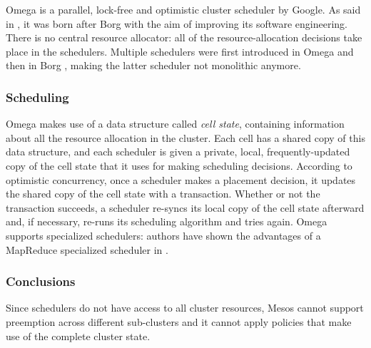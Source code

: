Omega \cite{omega} is a parallel, lock-free and optimistic cluster scheduler by Google.
As said in \cite{borgomegakubernetes}, it was born after Borg \cite{borg} with the aim of improving its software engineering.
There is no central resource allocator: all of the resource-allocation decisions take place in the schedulers.
Multiple schedulers were first introduced in Omega \cite{omega} and then in Borg \cite{borg}, making the latter scheduler not monolithic anymore.

\subsubsection{Scheduling}
Omega \cite{omega} makes use of a data structure called \textit{cell state}, containing information about all the resource allocation in the cluster.
Each cell has a shared copy of this data structure, and each scheduler is given a private, local, frequently-updated copy of the cell state that it uses for making scheduling decisions.
According to optimistic concurrency, once a scheduler makes a placement decision, it updates the shared copy of the cell state with a transaction.
Whether or not the transaction succeeds, a scheduler re-syncs its local copy of the cell state afterward and, if necessary, re-runs its scheduling algorithm and tries again.
Omega \cite{omega} supports specialized schedulers: authors have shown the advantages of a MapReduce \cite{mapreduce} specialized scheduler in \cite{omega}.

\subsubsection{Conclusions}
Since schedulers do not have access to all cluster resources, Mesos \cite{mesos} cannot support preemption across different sub-clusters and it cannot apply policies that make use of the complete cluster state.

